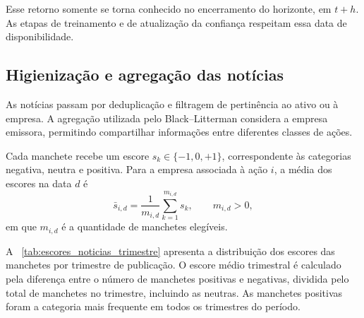 Esse retorno somente se torna conhecido no encerramento
do horizonte, em $t+h$. As etapas de treinamento e de
atualização da confiança respeitam essa data de
disponibilidade.

\subsection{Higienização e agregação das notícias}

As notícias passam por deduplicação e filtragem de
pertinência ao ativo ou à empresa. A agregação utilizada
pelo Black--Litterman considera a empresa emissora,
permitindo compartilhar informações entre diferentes
classes de ações.

Cada manchete recebe um escore
$s_k\in\{-1,0,+1\}$, correspondente às categorias
negativa, neutra e positiva. Para a empresa associada
à ação $i$, a média dos escores na data $d$ é
\begin{equation}
\bar{s}_{i,d}
=
\frac{1}{m_{i,d}}
\sum_{k=1}^{m_{i,d}}s_k,
\qquad m_{i,d}>0,
\label{eq:sent_medio_cap4}
\end{equation}
em que $m_{i,d}$ é a quantidade de manchetes elegíveis.

A ~\ref{tab:escores_noticias_trimestre} apresenta a
distribuição dos escores das manchetes por trimestre de
publicação. O escore médio trimestral é calculado pela
diferença entre o número de manchetes positivas e negativas,
dividida pelo total de manchetes no trimestre, incluindo
as neutras. As manchetes positivas foram a categoria mais
frequente em todos os trimestres do período.

